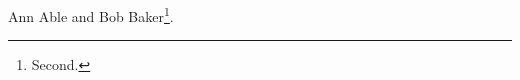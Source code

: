 \documentclass{article}
\begin{document}
Ann Able\footnotemark{} and Bob Baker\footnote[2]{Second.}.
\end{document}
